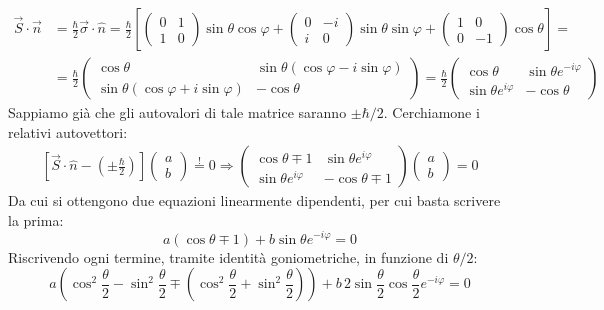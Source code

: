 \documentclass[../../FisicaTeorica.tex]{subfiles}
\begin{document}
\begin{align*}
\vec{S}\cdot \vec{n} &= \frac{\hbar}{2}\vec{\sigma}\cdot\hat{n} =\frac{\hbar}{2}\left[\begin{pmatrix}
0 & 1\\
1 & 0
\end{pmatrix}\sin\theta\cos\varphi + 
\begin{pmatrix}
0 & -i\\
i & 0
\end{pmatrix}\sin\theta\sin\varphi + \begin{pmatrix}
1 & 0\\
0 & -1
\end{pmatrix}\cos\theta
\right] =\\
&= \frac{\hbar}{2}\begin{pmatrix}
\cos\theta & \sin\theta (\cos\varphi-i\sin\varphi)\\
\sin\theta(\cos\varphi + i\sin\varphi) & -\cos\theta
\end{pmatrix}
= \frac{\hbar}{2}\begin{pmatrix}
\cos\theta & \sin\theta e^{-i\varphi}\\
\sin\theta e^{i\varphi} & -\cos\theta
\end{pmatrix}
\end{align*}
Sappiamo già che gli autovalori di tale matrice saranno $\pm \hbar/2$. Cerchiamone i relativi autovettori:
\begin{align*}
\left[\vec{S}\cdot \hat{n} -\left(\pm\frac{\hbar}{2}\right)\right]\begin{pmatrix}
a\\b \end{pmatrix}\overset{!}{=}0\Rightarrow 
\begin{pmatrix}
\cos\theta \mp 1 & \sin\theta e^{i\varphi}\\
\sin\theta e^{i\varphi} & -\cos\theta \mp 1
\end{pmatrix}
\begin{pmatrix}
a\\
b
\end{pmatrix} = 0
\end{align*}
Da cui si ottengono due equazioni linearmente dipendenti, per cui basta scrivere la prima:
\[
a(\cos\theta \mp 1) + b\sin\theta e^{-i\varphi}=0
\]
Riscrivendo ogni termine, tramite identità goniometriche, in funzione di $\theta/2$:
\[
a\left(\cos^2\frac{\theta}{2}-\sin^2 \frac{\theta}{2} \mp\left(\cos^2 \frac{\theta}{2}+\sin^2\frac{\theta}{2}\right)\right) +b\,2\sin\frac{\theta}{2}\cos\frac{\theta}{2} e^{-i\varphi} = 0
\]
\end{document}
